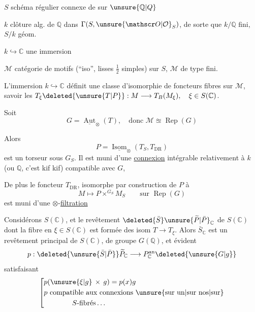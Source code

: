 $S$ schéma régulier connexe de  sur $\unsure{\mathbb Q|Q}$

$k$ clôture alg. de $\mathbb Q$ dans $\Gamma(S,\unsure{\mathscr O|\mathcal O}_S)$, de sorte que $k/\mathbb Q$ fini, $S/k$ géom. 

$k\hookrightarrow\mathbb C$ une immersion

$\mathcal M$ catégorie de motifs (``iso'', lisses $\frac12$ simples) sur $S$, $\mathcal M$ de type fini.

L'immersion $k\hookrightarrow\mathbb C$ définit une classe d'isomorphie de foncteurs fibres sur $\mathcal M$, savoir les $T_{\xi}\deleted{\unsure{T|P}}:M\longrightarrow T_B(M_{\xi}),\quad \xi\in S(\mathbb C)$.

Soit  
\[
G=\underline{\operatorname{Aut}}_{\otimes}(T),\quad\text{donc }\mathcal M\approxeq\operatorname{Rep}(G)
\]

Alors
\[
P=\underline{\operatorname{Isom}}_{\otimes}(T_S,T_{\mathrm{DR}})
\]
est un torseur sous $G_S$. Il est muni d'une \uline{connexion} intégrable relativement à $k$ (ou $\mathbb Q$, c'est kif kif) compatible avec $G$,

De plus le foncteur $T_{\mathrm{DR}}$, isomorphe par construction de $P$ à
\[
M\longmapsto P\mathbin{\times}^{G_S}M_S\qquad\text{sur }\operatorname{Rep}(G)
\]
est muni d'une $\otimes$-\uline{filtration}

 Considérons $S(\mathbb C)$, et le revêtement $\deleted{\bar S}\unsure{\widetilde P|\bar P}_{\mathbb C}$ de $S(\mathbb C)$ dont la fibre en $\xi\in S(\mathbb C)$ est formée des isom $T\longrightarrow T_{\xi}$. Alors $\bar S_{\mathbb C}$ est un revêtement principal de $S(\mathbb C)$, de groupe $G(\mathbb Q)$,  et      évident
\[
p:\deleted{\unsure{\bar S|\bar P}}\widetilde P_{\mathbb C}
\longrightarrow P_{\mathbb C}^{\mathrm{an}}\deleted{\unsure{G|g}}
\]
satisfaisant
\[
\left[\begin{aligned}
&p(\unsure{\xi|g}\,\times\,g)=p(x)g\\
&p\ \text{compatible aux connexions \unsure{sur un|sur nos|sur}}\\
&\hspace{4em}S\text{-fibrés}\ldots
\end{aligned}\right.
\]

